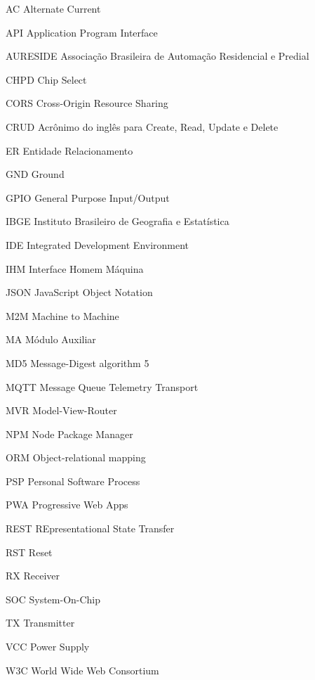 \documentclass[
	12pt,				%
	openright,			%
	oneside,			%
	a4paper,			%
	chapter=TITLE,		%
	english,			%
	french,				%
	spanish,			%
	brazil,				%
	]{abntex2}
\begin{document}
\begin{siglas}
  \item[AC] Alternate Current
  \item[API] Application Program Interface
  \item[AURESIDE] Associação Brasileira de Automação Residencial e Predial
  \item[CHPD] Chip Select
  \item [CORS] Cross-Origin Resource Sharing
  \item[CRUD] Acrônimo do inglês para Create, Read, Update e Delete
  \item[ER] Entidade Relacionamento
  \item[GND] Ground
  \item[GPIO] General Purpose Input/Output
  \item[IBGE] Instituto Brasileiro de Geografia e Estatística
  \item[IDE] Integrated Development Environment
  \item[IHM] Interface Homem Máquina
  \item[JSON] JavaScript Object Notation
  \item[M2M] Machine to Machine
  \item[MA] Módulo Auxiliar
  \item[MD5] Message-Digest algorithm 5
  \item[MQTT] Message Queue Telemetry Transport
  \item[MVR] Model-View-Router
  \item[NPM] Node Package Manager
  \item[ORM] Object-relational mapping
  \item[PSP] Personal Software Process
  \item[PWA] Progressive Web Apps
  \item[REST] REpresentational State Transfer
  \item[RST] Reset
  \item[RX] Receiver
  \item[SOC] System-On-Chip
  \item[TX] Transmitter
  \item[VCC] Power Supply
  \item[W3C] World Wide Web Consortium
\end{siglas}


\tableofcontents*
\cleardoublepage
\end{document}
